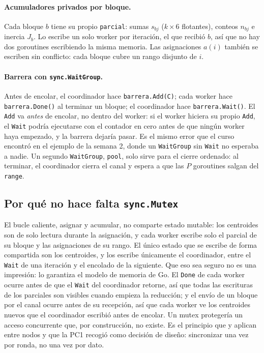 \paragraph{Acumuladores privados por bloque.} Cada bloque $b$ tiene su propio
\texttt{parcial}: sumas $s_{bj}$ ($k \times 6$ flotantes), conteos $n_{bj}$ e inercia $J_b$. Lo
escribe un solo worker por iteración, el que recibió $b$, así que no hay dos goroutines escribiendo
la misma memoria. Las asignaciones $a(i)$ también se escriben sin conflicto: cada bloque cubre un
rango disjunto de $i$.

\paragraph{Barrera con \texttt{sync.WaitGroup}.} Antes de encolar, el coordinador hace
\texttt{barrera.Add(C)}; cada worker hace \texttt{barrera.Done()} al terminar un bloque; el
coordinador hace \texttt{barrera.Wait()}. El \texttt{Add} va \emph{antes} de encolar, no dentro del
worker: si el worker hiciera su propio \texttt{Add}, el \texttt{Wait} podría ejecutarse con el
contador en cero antes de que ningún worker haya empezado, y la barrera dejaría pasar. Es el mismo
error que el curso encontró en el ejemplo de la semana 2, donde un \texttt{WaitGroup} sin
\texttt{Wait} no esperaba a nadie. Un segundo \texttt{WaitGroup}, \texttt{pool}, solo sirve para el
cierre ordenado: al terminar, el coordinador cierra el canal y espera a que las $P$ goroutines
salgan del \texttt{range}.

\subsection{Por qué no hace falta \texttt{sync.Mutex}}

El bucle caliente, asignar y acumular, no comparte estado mutable: los centroides son de solo lectura
durante la asignación, y cada worker escribe solo el parcial de su bloque y las asignaciones de su
rango. El único estado que se escribe de forma compartida son los centroides, y los escribe
únicamente el coordinador, entre el \texttt{Wait} de una iteración y el encolado de la siguiente. Que
eso sea seguro no es una impresión: lo garantiza el modelo de memoria de Go. El \texttt{Done} de cada
worker ocurre antes de que el \texttt{Wait} del coordinador retorne, así que todas las escrituras de
los parciales son visibles cuando empieza la reducción; y el envío de un bloque por el canal ocurre
antes de su recepción, así que cada worker ve los centroides nuevos que el coordinador escribió antes
de encolar. Un mutex protegería un acceso concurrente que, por construcción, no existe. Es el
principio que \textcite{hess2023} y \textcite{xu2021} aplican entre nodos y que la PC1 recogió como
decisión de diseño: sincronizar una vez por ronda, no una vez por dato.

